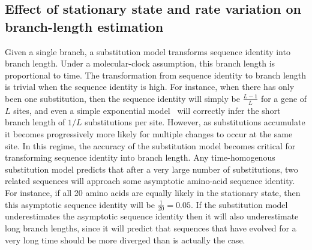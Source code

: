 \documentclass[11pt]{article}
\begin{document}
\subsection*{Effect of stationary state and rate variation on branch-length estimation}
Given a single branch, a substitution model transforms sequence identity into branch length.
Under a molecular-clock assumption, this branch length is proportional to time.
The transformation from sequence identity to branch length is trivial when the sequence identity is high.
For instance, when there has only been one substitution, then the sequence identity will simply be $\frac{L - 1}{L}$ for a gene of $L$ sites, and even a simple exponential model~\citep{zuckerkandl1965} will correctly infer the short branch length of $1/L$ substitutions per site.
However, as substitutions accumulate it becomes progressively more likely for multiple changes to occur at the same site.
In this regime, the accuracy of the substitution model becomes critical for transforming sequence identity into branch length.
Any time-homogenous substitution model predicts that after a very large number of substitutions, two related sequences will approach some asymptotic amino-acid sequence identity.
For instance, if all 20 amino acids are equally likely in the stationary state, then this asymptotic sequence identity will be $\frac{1}{20} = 0.05$.
If the substitution model underestimates the asymptotic sequence identity then it will also underestimate long branch lengths, since it will predict that sequences that have evolved for a very long time should be more diverged than is actually the case.
\end{document}
